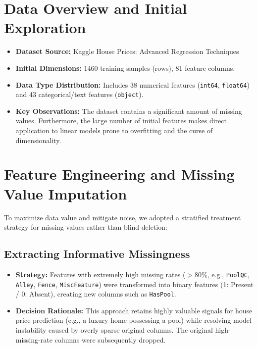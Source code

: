 \documentclass[11pt]{article}
\begin{document}
\section{Data Overview and Initial Exploration}
\begin{itemize}[leftmargin=*]
    \item \textbf{Dataset Source:} Kaggle House Prices: Advanced Regression Techniques
    \item \textbf{Initial Dimensions:} 1460 training samples (rows), 81 feature columns.
    \item \textbf{Data Type Distribution:} Includes 38 numerical features (\texttt{int64}, \texttt{float64}) and 43 categorical/text features (\texttt{object}).
    \item \textbf{Key Observations:} The dataset contains a significant amount of missing values. Furthermore, the large number of initial features makes direct application to linear models prone to overfitting and the curse of dimensionality.
\end{itemize}

\section{Feature Engineering and Missing Value Imputation}
To maximize data value and mitigate noise, we adopted a stratified treatment strategy for missing values rather than blind deletion:

\subsection{Extracting Informative Missingness}
\begin{itemize}[leftmargin=*]
    \item \textbf{Strategy:} Features with extremely high missing rates ($>80\%$, e.g., \texttt{PoolQC}, \texttt{Alley}, \texttt{Fence}, \texttt{MiscFeature}) were transformed into binary features (1: Present / 0: Absent), creating new columns such as \texttt{HasPool}.
    \item \textbf{Decision Rationale:} This approach retains highly valuable signals for house price prediction (e.g., a luxury home possessing a pool) while resolving model instability caused by overly sparse original columns. The original high-missing-rate columns were subsequently dropped.
\end{itemize}
\end{document}
